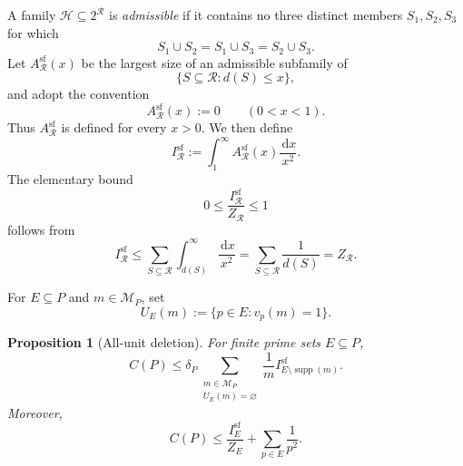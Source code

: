 \documentclass[11pt]{article}
\numberwithin{equation}{section}
\theoremstyle{plain}
\newtheorem{proposition}[theorem]{Proposition}
\newcommand{\1}{\mathbf 1}
\newcommand{\dd}{\,\mathrm d}
\newcommand{\cM}{\mathcal M}
\newcommand{\cR}{\mathcal R}
\newcommand{\supp}{\operatorname{supp}}
\begin{document}
A family $\mathcal H\subseteq2^{\cR}$ is \emph{admissible} if it contains
no three distinct members $S_1,S_2,S_3$ for which
\begin{equation}\label{eq:equal-unions}
 S_1\cup S_2=S_1\cup S_3=S_2\cup S_3.
\end{equation}
Let $A_{\cR}^{\mathrm{sf}}(x)$ be the largest size of an admissible
subfamily of
\[
 \{S\subseteq\cR:d(S)\le x\},
\]
and adopt the convention
\begin{equation}\label{eq:capacity-zero-convention}
 A_{\cR}^{\mathrm{sf}}(x):=0\qquad(0<x<1).
\end{equation}
Thus $A_{\cR}^{\mathrm{sf}}$ is defined for every $x>0$.  We then define
\begin{equation}\label{eq:squarefree-capacity}
 I_{\cR}^{\mathrm{sf}}
 :=\int_1^\infty A_{\cR}^{\mathrm{sf}}(x)\frac{\dd x}{x^2}.
\end{equation}
The elementary bound
\begin{equation}\label{eq:capacity-trivial}
 0\le\frac{I_{\cR}^{\mathrm{sf}}}{Z_{\cR}}\le1
\end{equation}
follows from
\[
 I_{\cR}^{\mathrm{sf}}
 \le\sum_{S\subseteq\cR}\int_{d(S)}^\infty\frac{\dd x}{x^2}
 =\sum_{S\subseteq\cR}\frac1{d(S)}=Z_{\cR}.
\]

For $E\subseteq P$ and $m\in\cM_P$, set
\[
 U_E(m):=\{p\in E:v_p(m)=1\}.
\]

\begin{proposition}[All-unit deletion]\label{prop:unit-deletion}
For finite prime sets $E\subseteq P$,
\begin{equation}\label{eq:deletion-bound}
 C(P)\le\delta_P
 \sum_{\substack{m\in\cM_P\\U_E(m)=\varnothing}}
 \frac1m I_{E\setminus\supp(m)}^{\mathrm{sf}}.
\end{equation}
Moreover,
\begin{equation}\label{eq:deletion-normalized}
 C(P)\le
 \frac{I_E^{\mathrm{sf}}}{Z_E}+\sum_{p\in E}\frac1{p^2}.
\end{equation}
\end{proposition}
\end{document}
